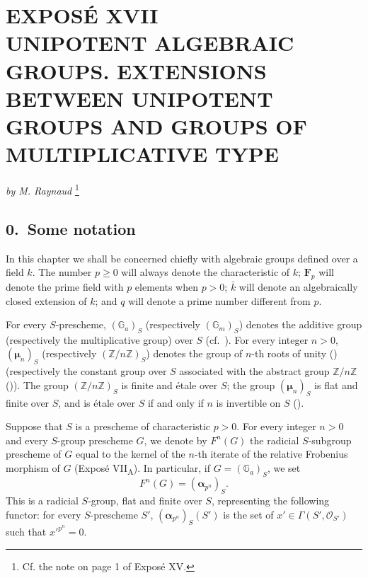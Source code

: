 
\chapter*{EXPOSÉ XVII\\[0.4em]
UNIPOTENT ALGEBRAIC GROUPS. EXTENSIONS BETWEEN UNIPOTENT GROUPS AND GROUPS OF MULTIPLICATIVE TYPE}

\begin{center}
\textit{by M. Raynaud}%
\begingroup
\renewcommand{\thefootnote}{*}%
\footnote{Cf. the note on page 1 of Exposé XV.}%
\endgroup
\end{center}

\section*{0.\ Some notation}

In this chapter we shall be concerned chiefly with algebraic groups defined over a
field \(k\).  The number \(p\geq 0\) will always denote the characteristic of \(k\);
\(\mathbf F_p\) will denote the prime field with \(p\) elements when \(p>0\);
\(\bar{k}\) will denote an algebraically closed extension of \(k\); and \(q\) will
denote a prime number different from \(p\).

For every \(S\)-prescheme, \((\mathbb G_a)_S\) (respectively
\((\mathbb G_m)_S\)) denotes the additive group (respectively the multiplicative
group) over \(S\) (cf.\ ).  For every integer \(n>0\),
\((\boldsymbol\mu_n)_S\) (respectively \((\mathbb Z/n\mathbb Z)_S\)) denotes the
group of \(n\)-th roots of unity () (respectively the constant group
over \(S\) associated with the abstract group \(\mathbb Z/n\mathbb Z\)
()).  The group \((\mathbb Z/n\mathbb Z)_S\) is finite and étale
over \(S\); the group \((\boldsymbol\mu_n)_S\) is flat and finite over \(S\), and
is étale over \(S\) if and only if \(n\) is invertible on \(S\)
().

Suppose that \(S\) is a prescheme of characteristic \(p>0\).  For every integer
\(n>0\) and every \(S\)-group prescheme \(G\), we denote by \(F^n(G)\) the
radicial \(S\)-subgroup prescheme of \(G\) equal to the kernel of the \(n\)-th
iterate of the relative Frobenius morphism of \(G\) (Exposé VII\textsubscript{A}).
In particular, if \(G=(\mathbb G_a)_S\), we set
\[
  F^n(G)=(\boldsymbol\alpha_{p^n})_S .
\]
This is a radicial \(S\)-group, flat and finite over \(S\), representing the
following functor: for every \(S\)-prescheme \(S'\),
\((\boldsymbol\alpha_{p^n})_S(S')\) is the set of
\(x'\in\Gamma(S',\mathcal O_{S'})\) such that \(x'^{p^n}=0\).

